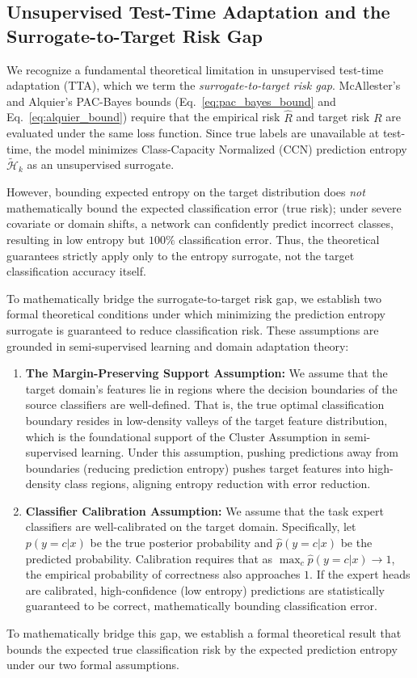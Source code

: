 \subsection{Unsupervised Test-Time Adaptation and the Surrogate-to-Target Risk Gap}
\label{subsec:surrogate_gap}

We recognize a fundamental theoretical limitation in unsupervised test-time
adaptation (TTA), which we term the \emph{surrogate-to-target risk gap}.
McAllester's and Alquier's PAC-Bayes bounds (Eq.~\ref{eq:pac_bayes_bound} and
Eq.~\ref{eq:alquier_bound}) require that the empirical risk $\hat{R}$ and target
risk $R$ are evaluated under the same loss function. Since true labels are
unavailable at test-time, the model minimizes Class-Capacity Normalized (CCN)
prediction entropy $\tilde{\mathcal{H}}_k$ as an unsupervised surrogate.

However, bounding expected entropy on the target distribution does \emph{not}
mathematically bound the expected classification error (true risk); under severe
covariate or domain shifts, a network can confidently predict incorrect classes,
resulting in low entropy but $100\%$ classification error. Thus, the theoretical
guarantees strictly apply only to the entropy surrogate, not the target
classification accuracy itself.

To mathematically bridge the surrogate-to-target risk gap, we establish two
formal theoretical conditions under which minimizing the prediction entropy
surrogate is guaranteed to reduce classification risk. These assumptions are
grounded in semi-supervised learning and domain adaptation theory:
\begin{enumerate}
    \item \textbf{The Margin-Preserving Support Assumption:} We assume that the
    target domain's features lie in regions where the decision boundaries of the
    source classifiers are well-defined. That is, the true optimal
    classification boundary resides in low-density valleys of the target feature
    distribution, which is the foundational support of the Cluster Assumption in
    semi-supervised learning. Under this assumption, pushing predictions away
    from boundaries (reducing prediction entropy) pushes target features into
    high-density class regions, aligning entropy reduction with error reduction.
    \item \textbf{Classifier Calibration Assumption:} We assume that the task
    expert classifiers are well-calibrated on the target domain. Specifically,
    let $p(y=c | x)$ be the true posterior probability and $\hat{p}(y=c | x)$ be
    the predicted probability. Calibration requires that as $\max_c
    \hat{p}(y=c|x) \to 1$, the empirical probability of correctness also
    approaches $1$. If the expert heads are calibrated, high-confidence (low
    entropy) predictions are statistically guaranteed to be correct,
    mathematically bounding classification error.
\end{enumerate}
To mathematically bridge this gap, we establish a formal theoretical result that
bounds the expected true classification risk by the expected prediction entropy
under our two formal assumptions.

